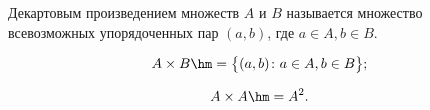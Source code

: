 
    Декартовым произведением множеств $A$ и $B$ называется множество всевозможных упорядоченных пар $(a,b)$, где $a\in A,b\in B$.

    \[
        A\times B\hm=\big\{(a,b)\colon a\in A,b\in B\big\};
    \]

    \[
        A\times A\hm=A^2.
    \]
